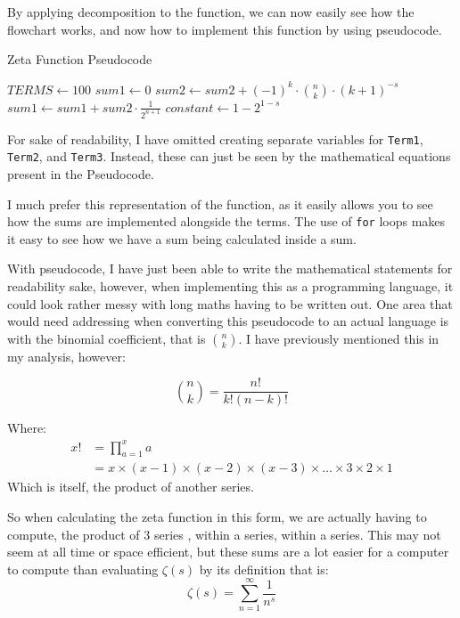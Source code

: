 \documentclass[12pt]{article}
\begin{document}
By applying decomposition to the function, we can now easily see how the flowchart works, and now how to implement this function by using pseudocode.
\clearpage
\begin{algorithm}[h]
    \caption{Zeta Function Pseudocode}
    \begin{algorithmic}
            \State $TERMS \gets 100$
                \State \Return {$\infty$}
            \Else
                    \State $sum1 \gets 0$
                        \State $sum2 \gets sum2 + (-1)^k \cdot \binom{n}{k} \cdot (k+1)^{-s}$
                    \EndFor
                    \State $sum1 \gets sum1 + sum2 \cdot \frac{1}{2^{n+1}}$
                \EndFor
                \State $constant \gets 1-2^{1-s}$
                \State {}
            \EndIf
        \EndFunction
    \end{algorithmic}
\end{algorithm}

For sake of readability, I have omitted creating separate variables for \texttt{Term1}, \texttt{Term2}, and \texttt{Term3}. Instead, these can just be seen by the mathematical equations present in the Pseudocode.

I much prefer this representation of the function, as it easily allows you to see how the sums are implemented alongside the terms. The use of \texttt{for} loops makes it easy to see how we have a sum being calculated inside a sum.

With pseudocode, I have just been able to write the mathematical statements for readability sake, however, when implementing this as a programming language, it could look rather messy with long maths having to be written out.
One area that would need addressing when converting this pseudocode to an actual language is with the binomial coefficient, that is $\binom{n}{k}$. I have previously mentioned this in my analysis, however:

$$\binom{n}{k} = \frac{n!}{k!(n-k)!}$$

Where:
\begin{align*}
    x! &= \prod_{a=1}^x a\\
    &= x \times (x-1) \times (x-2) \times (x-3) \times \dots \times 3 \times 2 \times 1
\end{align*}
Which is itself, the product of another series.

So when calculating the zeta function in this form, we are actually having to compute, the product of 3 series , within a series, within a series. This may not seem at all time or space efficient, but these sums are a lot easier for a computer to compute than evaluating $\zeta(s)$ by its definition that is:
$$\zeta(s) = \sum^{\infty}_{n=1} \frac{1}{n^s}$$
\end{document}
